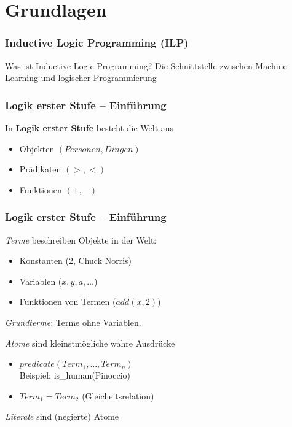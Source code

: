 \section{Grundlagen}

\begin{frame}
	\frametitle{Inductive Logic Programming (ILP)}

	\begin{block}{Was ist Inductive Logic Programming?}
			Die Schnittstelle zwischen Machine Learning und logischer Programmierung
	\end{block}
\end{frame}

\begin{frame}
	\frametitle{Logik erster Stufe -- Einführung}

	In \textbf{Logik erster Stufe} besteht die Welt aus
	\begin{itemize}
		\item Objekten  $(Personen, Dingen)$
		\item Prädikaten $(>, <)$
		\item Funktionen $(+, -)$
	\end{itemize}
\end{frame}

\begin{frame}
	\frametitle{Logik erster Stufe -- Einführung}
	\emph{Terme} beschreiben Objekte in der Welt:\\
	\begin{itemize}
		\item Konstanten  ($2$, Chuck Norris)
		\item Variablen   ($x,y, a, \ldots$)
		\item Funktionen von Termen ($add(x,2)$)
	\end{itemize}

	\emph{Grundterme}: Terme ohne Variablen.
	\pause

	\vspace{15pt}
	\emph{Atome} sind kleinstmögliche wahre Ausdrücke
	\begin{itemize}
		\item $predicate(Term_1, \ldots, Term_n)$\\
			Beispiel: is\_human(Pinoccio)
		\item $Term_1 = Term_2$ (Gleicheitsrelation)
	\end{itemize}
	\emph{Literale} sind (negierte) Atome

\end{frame}

